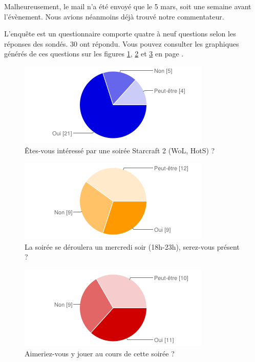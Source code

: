 Malheureusement, le mail n'a été envoyé que le 5 mars, soit une semaine avant l'évènement.
Nous avions néanmoins déjà trouvé notre commentateur.

L'enquête est un questionnaire comporte quatre à neuf questions selon
les réponses des sondés. 30 ont répondu.  Vous pouvez consulter les
graphiques générés de ces questions sur les figures \ref{char1},
\ref{char2} et \ref{char3} en page \pageref{char1}.

\begin{figure}
  \begin{center}
    \includegraphics[scale=1]{images/chart_1.png}
    \caption{Êtes-vous intéressé par une soirée Starcraft 2 (WoL, HotS) ?}
    \label{char1}
  \end{center}
\end{figure}

\begin{figure}
  \begin{center}
    \includegraphics[scale=1]{images/chart_2.png}
    \caption{La soirée se déroulera un mercredi soir (18h-23h), serez-vous présent ?}
    \label{char2}
  \end{center}
\end{figure}

\begin{figure}
  \begin{center}
    \includegraphics[scale=1]{images/chart_3.png}
    \caption{Aimeriez-vous y jouer au cours de cette soirée ?}
    \label{char3}
  \end{center}
\end{figure}

